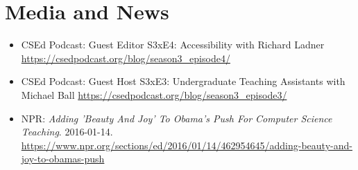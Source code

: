 \section{Media and News}

\vspace{6pt}

\begin{itemize}

  \setlength\itemsep{1em}

    \item{CSEd Podcast: Guest Editor\newline
    S3xE4: Accessibility with Richard Ladner
    \newline
    \footnotesize \href{https://csedpodcast.org/blog/season3\_episode4/}{https://csedpodcast.org/blog/season3\_episode4/}}
    
    \item{CSEd Podcast: Guest Host \newline
    S3xE3: Undergraduate Teaching Assistants with Michael Ball
    \newline
    \footnotesize \href{https://csedpodcast.org/blog/season3\_episode3/}{https://csedpodcast.org/blog/season3\_episode3/}}
    

    \item{NPR: \textit{Adding 'Beauty And Joy' To Obama's Push For Computer Science Teaching}. 2016-01-14.}
    \newline
    \footnotesize{\href{https://www.npr.org/sections/ed/2016/01/14/462954645/adding-beauty-and-joy-to-obamas-push}{https://www.npr.org/sections/ed/2016/01/14/462954645/adding-beauty-and-joy-to-obamas-push}}

\end{itemize}

\vspace{2pt}
